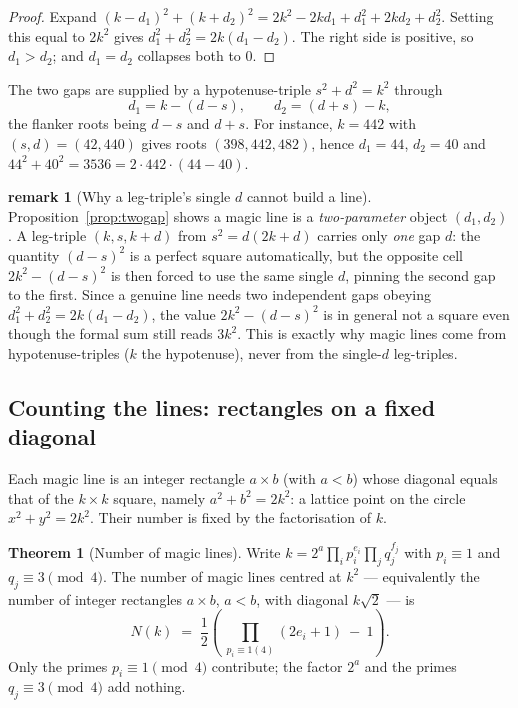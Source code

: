\documentclass[11pt]{article}
\theoremstyle{definition}
\newtheorem{theorem}{Theorem}
\newtheorem{remark}{remark}
\begin{document}
\begin{proof}
Expand $(k-d_{1})^{2}+(k+d_{2})^{2}=2k^{2}-2kd_{1}+d_{1}^{2}+2kd_{2}+d_{2}^{2}$.
Setting this equal to $2k^{2}$ gives $d_{1}^{2}+d_{2}^{2}=2k(d_{1}-d_{2})$. The
right side is positive, so $d_{1}>d_{2}$; and $d_{1}=d_{2}$ collapses both to $0$.
\end{proof}

\noindent The two gaps are supplied by a hypotenuse-triple $s^{2}+d^{2}=k^{2}$
through
\[
  d_{1}=k-(d-s),\qquad d_{2}=(d+s)-k,
\]
the flanker roots being $d-s$ and $d+s$. For instance, $k=442$ with
$(s,d)=(42,440)$ gives roots $(398,442,482)$, hence $d_{1}=44$, $d_{2}=40$ and
$44^{2}+40^{2}=3536=2\cdot442\cdot(44-40)$.

\begin{remark}[Why a leg-triple's single $d$ cannot build a line]
Proposition~\ref{prop:twogap} shows a magic line is a \emph{two-parameter}
object $(d_{1},d_{2})$. A leg-triple $(k,s,k+d)$ from $s^{2}=d(2k+d)$ carries
only \emph{one} gap $d$: the quantity $(d-s)^{2}$ is a perfect square
automatically, but the opposite cell $2k^{2}-(d-s)^{2}$ is then forced to use the
same single $d$, pinning the second gap to the first. Since a genuine line needs
two independent gaps obeying $d_{1}^{2}+d_{2}^{2}=2k(d_{1}-d_{2})$, the value
$2k^{2}-(d-s)^{2}$ is in general not a square even though the formal sum still
reads $3k^{2}$. This is exactly why magic lines come from hypotenuse-triples
($k$ the hypotenuse), never from the single-$d$ leg-triples.
\end{remark}

\subsection{Counting the lines: rectangles on a fixed diagonal}

Each magic line is an integer rectangle $a\times b$ (with $a<b$) whose diagonal
equals that of the $k\times k$ square, namely $a^{2}+b^{2}=2k^{2}$: a lattice
point on the circle $x^{2}+y^{2}=2k^{2}$. Their number is fixed by the
factorisation of $k$.

\begin{theorem}[Number of magic lines]\label{thm:count}
Write $k=2^{a}\prod_i p_i^{e_i}\prod_j q_j^{f_j}$ with $p_i\equiv1$ and
$q_j\equiv3\pmod4$. The number of magic lines centred at $k^{2}$ --- equivalently
the number of integer rectangles $a\times b$, $a<b$, with diagonal $k\sqrt2$ --- is
\[
  N(k) \;=\; \frac{1}{2}\left(\ \prod_{p_i\equiv1(4)}(2e_i+1)\ -\ 1\right).
\]
Only the primes $p_i\equiv1\pmod4$ contribute; the factor $2^{a}$ and the primes
$q_j\equiv3\pmod4$ add nothing.
\end{theorem}
\end{document}

